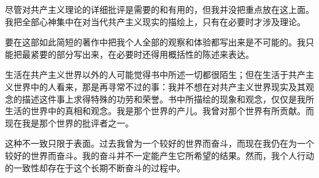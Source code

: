 \documentclass[12pt,oneside]{book}
\begin{document}
\begin{common-format}
尽管对共产主义理论的详细批评是需要的和有用的，但我并没把重点放在这上面。我把全部心神集中在对当代共产主义现实的描绘上，只有在必要时才涉及理论。

要在这部如此简短的著作中把我个人全部的观察和体验都写出来是不可能的。我只能把最紧要的部分写出来，在必要时还得用概括性的陈述来表达。

生活在共产主义世界以外的人可能觉得书中所述一切都很陌生；但在生活于共产主义世界中的人看来，那是再寻常不过的事：我并不想在对共产主义世界现实及其观念的描述这件事上求得特殊的功劳和荣誉。书中所描绘的现象和观念，仅仅是我所生活的世界中的真相和观念。我是那个世界的产儿。我曾对那个世界有所贡献。而现在我是那个世界的批评者之一。

这种不一致只限于表面。过去我曾为一个较好的世界而奋斗，而现在我仍在为一个较好的世界而奋斗。我的奋斗并不一定能产生它所希望的结果。然而，我个人行动的一致性却存在于这个长期不断奋斗的过程中。



\end{common-format}


\setcounter{tocdepth}{0}
\tableofcontents
\end{document}
